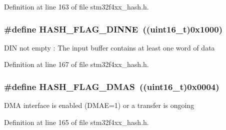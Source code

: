 Definition at line 163 of file stm32f4xx\-\_\-hash.\-h.

\hypertarget{group___h_a_s_h__flags__definition_gadca9225b146f649a24d34cc813fe0c92}{
\subsubsection[{H\-A\-S\-H\-\_\-\-F\-L\-A\-G\-\_\-\-D\-I\-N\-N\-E}]{\setlength{\rightskip}{0pt plus 5cm}\#define H\-A\-S\-H\-\_\-\-F\-L\-A\-G\-\_\-\-D\-I\-N\-N\-E~((uint16\-\_\-t)0x1000)}}\label{group___h_a_s_h__flags__definition_gadca9225b146f649a24d34cc813fe0c92}
D\-I\-N not empty \-: The input buffer contains at least one word of data 

Definition at line 167 of file stm32f4xx\-\_\-hash.\-h.

\hypertarget{group___h_a_s_h__flags__definition_ga576ba8b2dca0ec25fb6c53a07b285af7}{
\subsubsection[{H\-A\-S\-H\-\_\-\-F\-L\-A\-G\-\_\-\-D\-M\-A\-S}]{\setlength{\rightskip}{0pt plus 5cm}\#define H\-A\-S\-H\-\_\-\-F\-L\-A\-G\-\_\-\-D\-M\-A\-S~((uint16\-\_\-t)0x0004)}}\label{group___h_a_s_h__flags__definition_ga576ba8b2dca0ec25fb6c53a07b285af7}
D\-M\-A interface is enabled (D\-M\-A\-E=1) or a transfer is ongoing 

Definition at line 165 of file stm32f4xx\-\_\-hash.\-h.

